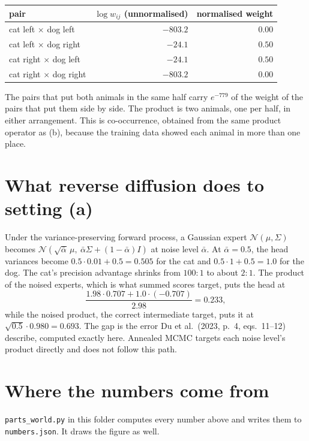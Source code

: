 \documentclass[11pt]{article}
\newcommand{\N}{\mathcal{N}}
\begin{document}
\begin{center}
\begin{tabular}{lrr}
\toprule
pair & $\log w_{ij}$ (unnormalised) & normalised weight \\
\midrule
cat left $\times$ dog left   & $-803.2$ & $0.00$ \\
cat left $\times$ dog right  & $-24.1$  & $0.50$ \\
cat right $\times$ dog left  & $-24.1$  & $0.50$ \\
cat right $\times$ dog right & $-803.2$ & $0.00$ \\
\bottomrule
\end{tabular}
\end{center}

The pairs that put both animals in the same half carry $e^{-779}$ of the weight of the pairs that put them
side by side. The product is two animals, one per half, in either arrangement. This is co-occurrence,
obtained from the same product operator as (b), because the training data showed each animal in more than
one place.

\section*{What reverse diffusion does to setting (a)}

Under the variance-preserving forward process, a Gaussian expert $\N(\mu,\Sigma)$ becomes
$\N(\sqrt{\bar\alpha}\,\mu,\ \bar\alpha\Sigma + (1-\bar\alpha)I)$ at noise level $\bar\alpha$. At
$\bar\alpha = 0.5$, the head variances become $0.5\cdot 0.01 + 0.5 = 0.505$ for the cat and
$0.5\cdot 1 + 0.5 = 1.0$ for the dog. The cat's precision advantage shrinks from $100{:}1$ to about
$2{:}1$. The product of the noised experts, which is what summed scores target, puts the head at
\[
\frac{1.98\cdot 0.707 + 1.0\cdot(-0.707)}{2.98} = 0.233,
\]
while the noised product, the correct intermediate target, puts it at $\sqrt{0.5}\cdot 0.980 = 0.693$.
The gap is the error Du et al.\ (2023, p.~4, eqs.~11--12) describe, computed exactly here. Annealed MCMC
targets each noise level's product directly and does not follow this path.

\section*{Where the numbers come from}

\texttt{parts\_world.py} in this folder computes every number above and writes them to
\texttt{numbers.json}. It draws the figure as well.
\end{document}

